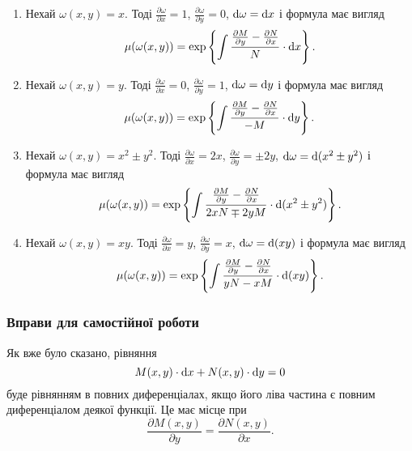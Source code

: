 \begin{enumerate}
	\item Нехай $\omega(x, y) = x$. Тоді $\frac{\partial \omega}{\partial x} = 1$, $\frac{\partial \omega}{\partial y} = 0$, $\mathop{}\!\mathrm{d} \omega = \mathop{}\!\mathrm{d} x$ і формула має вигляд
	\begin{equation}
		\label{eq:1.4.19}
		\mu(\omega(x,y)) = \exp\left\{\int \frac{\frac{\partial M}{\partial y} - \frac{\partial N}{\partial x} }{N} \cdot \mathop{}\!\mathrm{d} x\right\}.
	\end{equation}	
	\item Нехай $\omega(x, y) = y$. Тоді $\frac{\partial \omega}{\partial x} = 0$, $\frac{\partial \omega}{\partial y} = 1$, $\mathop{}\!\mathrm{d} \omega = \mathop{}\!\mathrm{d} y$ і формула має вигляд
	\begin{equation}
		\label{eq:1.4.20}
		\mu(\omega(x,y)) = \exp\left\{\int \frac{\frac{\partial M}{\partial y} - \frac{\partial N}{\partial x} }{-M} \cdot \mathop{}\!\mathrm{d} y\right\}.
	\end{equation}
	\item Нехай $\omega(x, y) = x^2 \pm y^2$. Тоді $\frac{\partial \omega}{\partial x} = 2 x$, $\frac{\partial \omega}{\partial y} = \pm 2y$, $\mathop{}\!\mathrm{d} \omega = \mathop{}\!\mathrm{d} (x^2 \pm y^2)$ і формула має вигляд
	\begin{equation}
		\label{eq:1.4.21}
		\mu(\omega(x,y)) = \exp\left\{\int \frac{\frac{\partial M}{\partial y} - \frac{\partial N}{\partial x} }{2 x N \mp 2 y M} \cdot \mathop{}\!\mathrm{d} (x^2 \pm y^2)\right\}.
	\end{equation}
	\item Нехай $\omega(x, y) = x y$. Тоді $\frac{\partial \omega}{\partial x} = y$, $\frac{\partial \omega}{\partial y} = x$, $\mathop{}\!\mathrm{d} \omega = \mathop{}\!\mathrm{d} (xy)$ і формула має вигляд
	\begin{equation}
		\label{eq:1.4.22}
		\mu(\omega(x,y)) = \exp\left\{\int \frac{\frac{\partial M}{\partial y} - \frac{\partial N}{\partial x} }{yN-xM} \cdot \mathop{}\!\mathrm{d} (xy)\right\}.
	\end{equation}
\end{enumerate}

\subsubsection{Вправи для самостійної роботи}
Як вже було сказано, рівняння \[M(x, y) \cdot \mathop{}\!\mathrm{d} x + N(x, y) \cdot \mathop{}\!\mathrm{d} y = 0\] буде рівнянням в повних диференціалах, якщо його ліва частина є повним диференціалом деякої функції. Це має місце при \[\frac{\partial M(x, y)}{\partial y} = \frac{\partial N(x, y)}{\partial x}.\]


